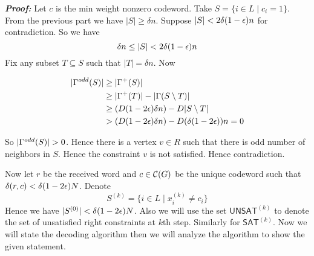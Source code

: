 \documentclass[a4paper, 11pt]{article}
\begin{document}
{\begin{enumerate}
	
	\textbf{\textit{Proof:}} 	Let $c$ is the min weight nonzero codeword. Take $S=\{i\in L\mid c_i=1\}$. From the previous part we have $|S|\geq \delta n$. Suppose $|S|<2\delta(1-\epsilon)n$ for contradiction. So we have $$\delta n\leq |S|< 2\delta(1-\epsilon)n$$ Fix any subset $T\subseteq S$ such that $|T|=\delta n$. Now 
	
	\begin{minipage}{0.40\textwidth}
		\begin{align*}
			|\Gamma^{odd}(S)| & \geq |\Gamma^+(S)|                               \\
			               & \geq |\Gamma^+(T)|-|\Gamma(S\setminus T)|           \\
			               & \geq (D(1-2\epsilon)\delta n)-D|S\setminus T|     \\
			               & > (D(1-2\epsilon)\delta n)-D(\delta (1-2\epsilon))n=0
		\end{align*}
	\end{minipage}
	\hspace{2cm}
	\begin{minipage}{0.40\textwidth}
	\end{minipage}
	\vspace{0.5cm}
	
	So $|\Gm^{odd}(S)|>0$. Hence there is a vertex $v\in R$ such that there is odd number of neighbors in $S$. Hence the constraint $v$ is not satisfied. Hence contradiction.\Qed
	
	\parinn
	
	Now let $r$ be the received word and $c\in \mathcal{C}(G)$ be the unique codeword such that $\delta(r,c)<\delta(1-2\epsilon)N$. Denote $$S^{(k)}=\{i\in L\mid x_i^{(k)}\neq c_i\}$$Hence we have $|S^{(0)}|<\delta(1-2\epsilon)N$. Also we will use the set $\mathsf{UNSAT}^{(k)}$ to denote the set of unsatisfied right constraints at $k$th step. Similarly for $\mathsf{SAT}^{(k)}$. Now we will state the decoding algorithm then we will analyze the algorithm to show the given statement.
		\pagebreak

\end{enumerate}}
\end{document}
